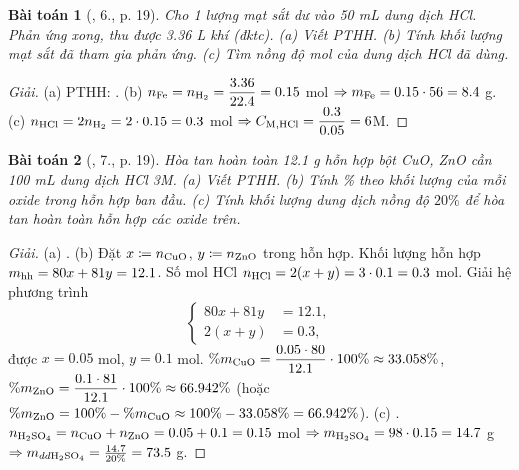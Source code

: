 \documentclass{article}
\newtheorem{baitoan}{Bài toán}
\begin{document}
\begin{baitoan}[\cite{SGK_Hoa_Hoc_9}, 6., p. 19]
	Cho 1 lượng mạt sắt dư vào {\rm50 mL} dung dịch {\rm HCl}. Phản ứng xong, thu được {\rm3.36 L} khí (đktc). (a) Viết PTHH. (b) Tính khối lượng mạt sắt đã tham gia phản ứng. (c) Tìm nồng độ mol của dung dịch {\rm HCl} đã dùng.
\end{baitoan}

\begin{proof}[Giải]
	(a) PTHH: . (b) $n_{\rm Fe} = n_{\ce{H2}} = \dfrac{3.36}{22.4} = 0.15$ mol $\Rightarrow m_{\rm Fe} = 0.15\cdot56 = 8.4$ g. (c) $n_{\rm HCl} = 2n_{\ce{H2}} = 2\cdot0.15 = 0.3$ mol $\Rightarrow C_{\rm M,HCl} =  \dfrac{0.3}{0.05} = 6$M.
\end{proof}

\begin{baitoan}[\cite{SGK_Hoa_Hoc_9}, 7., p. 19]
	Hòa tan hoàn toàn {\rm12.1 g} hỗn hợp bột {\rm CuO, ZnO} cần {\rm100 mL} dung dịch {\rm HCl 3M}. (a) Viết {\rm PTHH}. (b) Tính \% theo khối lượng của mỗi oxide trong hỗn hợp ban đầu. (c) Tính khối lượng dung dịch {\rm{}} nồng độ $20\%$ để hòa tan hoàn toàn hỗn hợp các oxide trên.
\end{baitoan}

\begin{proof}[Giải]
	(a) . (b) Đặt $x\coloneqq n_{\rm CuO}$, $y\coloneqq n_{\rm ZnO}$ trong hỗn hợp. Khối lượng hỗn hợp $m_{\rm hh} = 80x + 81y = 12.1$. Số mol HCl $n_{\rm HCl} = 2(x + y) = 3\cdot0.1 = 0.3$ mol. Giải hệ phương trình
	\begin{equation*}
		\left\{\begin{split}
			80x + 81y &= 12.1,\\
			2(x + y) &= 0.3,
		\end{split}\right.
	\end{equation*}
	được $x = 0.05$ mol, $y = 0.1$ mol. $\%m_{\rm CuO} = \dfrac{0.05\cdot80}{12.1}\cdot100\%\approx33.058\%$, $\%m_{\rm ZnO} = \dfrac{0.1\cdot81}{12.1}\cdot100\%\approx66.942\%$ (hoặc $\%m_{\rm ZnO} = 100\% - \%m_{\rm CuO}\approx100\% - 33.058\% = 66.942\%$). (c) . $n_{\ce{H2SO4}} = n_{\rm CuO} + n_{\rm ZnO} = 0.05 + 0.1 = 0.15$ mol $\Rightarrow m_{\ce{H2SO4}} = 98\cdot0.15 = 14.7$ g $\Rightarrow m_{dd\ce{H2SO4}} = \frac{14.7}{20\%} = 73.5$ g.
\end{proof}

\end{document}
